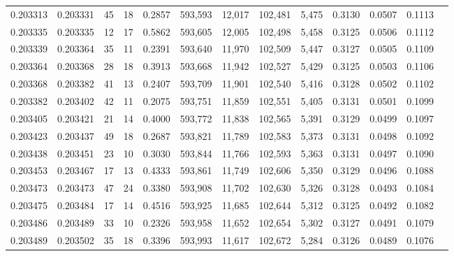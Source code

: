\begin{tabular}{rrrrrrrrrrrrr}
0.203313 & 0.203331 &    45 &  18 &                                     0.2857 & 593,593 &  12,017 & 102,481 &   5,475 & 0.3130 & 0.0507 & 0.1113 \\
0.203335 & 0.203335 &    12 &  17 &                                     0.5862 & 593,605 &  12,005 & 102,498 &   5,458 & 0.3125 & 0.0506 & 0.1112 \\
0.203339 & 0.203364 &    35 &  11 &                                     0.2391 & 593,640 &  11,970 & 102,509 &   5,447 & 0.3127 & 0.0505 & 0.1109 \\
0.203364 & 0.203368 &    28 &  18 &                                     0.3913 & 593,668 &  11,942 & 102,527 &   5,429 & 0.3125 & 0.0503 & 0.1106 \\
0.203368 & 0.203382 &    41 &  13 &                                     0.2407 & 593,709 &  11,901 & 102,540 &   5,416 & 0.3128 & 0.0502 & 0.1102 \\
0.203382 & 0.203402 &    42 &  11 &                                     0.2075 & 593,751 &  11,859 & 102,551 &   5,405 & 0.3131 & 0.0501 & 0.1099 \\
0.203405 & 0.203421 &    21 &  14 &                                     0.4000 & 593,772 &  11,838 & 102,565 &   5,391 & 0.3129 & 0.0499 & 0.1097 \\
0.203423 & 0.203437 &    49 &  18 &                                     0.2687 & 593,821 &  11,789 & 102,583 &   5,373 & 0.3131 & 0.0498 & 0.1092 \\
0.203438 & 0.203451 &    23 &  10 &                                     0.3030 & 593,844 &  11,766 & 102,593 &   5,363 & 0.3131 & 0.0497 & 0.1090 \\
0.203453 & 0.203467 &    17 &  13 &                                     0.4333 & 593,861 &  11,749 & 102,606 &   5,350 & 0.3129 & 0.0496 & 0.1088 \\
0.203473 & 0.203473 &    47 &  24 &                                     0.3380 & 593,908 &  11,702 & 102,630 &   5,326 & 0.3128 & 0.0493 & 0.1084 \\
0.203475 & 0.203484 &    17 &  14 &                                     0.4516 & 593,925 &  11,685 & 102,644 &   5,312 & 0.3125 & 0.0492 & 0.1082 \\
0.203486 & 0.203489 &    33 &  10 &                                     0.2326 & 593,958 &  11,652 & 102,654 &   5,302 & 0.3127 & 0.0491 & 0.1079 \\
0.203489 & 0.203502 &    35 &  18 &                                     0.3396 & 593,993 &  11,617 & 102,672 &   5,284 & 0.3126 & 0.0489 & 0.1076 \\

\end{tabular}
